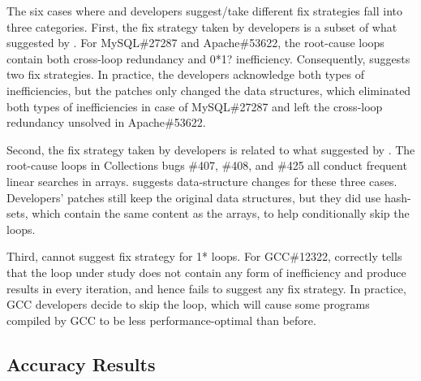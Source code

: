 The six cases where \Tool and developers suggest/take different fix strategies
fall into three categories.
First, the fix strategy taken by developers is a subset of what suggested by 
\Tool.
For MySQL\#27287 and Apache\#53622, the root-cause loops contain both
cross-loop redundancy and 0*1? inefficiency. Consequently, \Tool suggests two
fix strategies. In practice, the developers
acknowledge both types of inefficiencies, but the patches
only changed the data structures, which eliminated both types of inefficiencies 
in case of MySQL\#27287 and left the cross-loop redundancy unsolved in
Apache\#53622. 

Second, the fix strategy taken by developers is related to
what suggested by \Tool.
The root-cause loops in 
Collections bugs \#407, \#408, and \#425 all conduct frequent linear searches in arrays.
\Tool suggests data-structure changes for these three cases. Developers' patches 
still keep the original data structures, but they
did use hash-sets, which contain the same content as the arrays,
to help conditionally skip the loops. 

Third, \Tool cannot suggest fix strategy for 1* loops.
For GCC\#12322, \Tool correctly tells that the loop under study
does not contain any form of inefficiency and produce results in every 
iteration, and hence fails to suggest any fix strategy. In practice, GCC
developers decide to skip the loop, which will cause some programs compiled by
GCC
to be less performance-optimal than before. 

\subsection{Accuracy Results}
\label{sec:result_acc}

